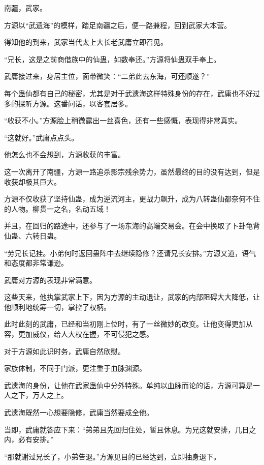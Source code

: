 
\begin{this_body}

南疆，武家。

方源以“武遗海”的模样，踏足南疆之后，便一路兼程，回到武家大本营。

得知他的到来，武家当代太上大长老武庸立即召见。

“兄长，这是之前商借族中的仙蛊，如数奉还。”方源将仙蛊双手奉上。

武庸接过来，身居主位，面带微笑：“二弟此去东海，可还顺遂？”

每个蛊仙都有自己的秘密，尤其是对于武遗海这样特殊身份的存在，武庸也不好过多的探听方源。这番问话，以客套居多。

“收获不小。”方源脸上稍微露出一丝喜色，还有一些感慨，表现得非常真实。

“这就好。”武庸点点头。

他怎么也不会想到，方源收获的丰富。

这一次离开了南疆，方源一路追杀影宗残余势力，虽然最终的目的没有达到，但是收获却极其巨大。

方源不仅收获了坚持仙蛊，成为逆流河主，更战力飙升，成为八转蛊仙都奈何不住的人物。柳贯一之名，名动五域！

并且，在回归的路途中，还参与了一场东海的高端交易会。在会中换取了卜卦龟背仙蛊、六转日蛊。

“劳兄长记挂。小弟何时返回蛊阵中去继续隐修？还请兄长安排。”方源又道，语气和态度都非常谦逊。

武庸对方源的表现非常满意。

这些天来，他执掌武家上下，因为方源的主动退让，武家的内部阻碍大大降低，让他顺利地统筹一切，掌控了权柄。

此时此刻的武庸，已经和当初刚上位时，有了一丝微妙的改变。让他变得更加从容，更加威仪，给人大权在握，不可侵犯之感。

对于方源如此识时务，武庸自然欣慰。

家族体制，不同于门派，更注重于血脉渊源。

武遗海的身份，让他在武家蛊仙中分外特殊。单纯以血脉而论的话，方源可算是一人之下，万人之上。

武遗海既然一心想要隐修，武庸当然要成全他。

当即，武庸就答应下来：“弟弟且先回归住处，暂且休息。为兄这就安排，几日之内，必有安排。”

“那就谢过兄长了，小弟告退。”方源见目的已经达到，立即抽身退下。


\end{this_body}
